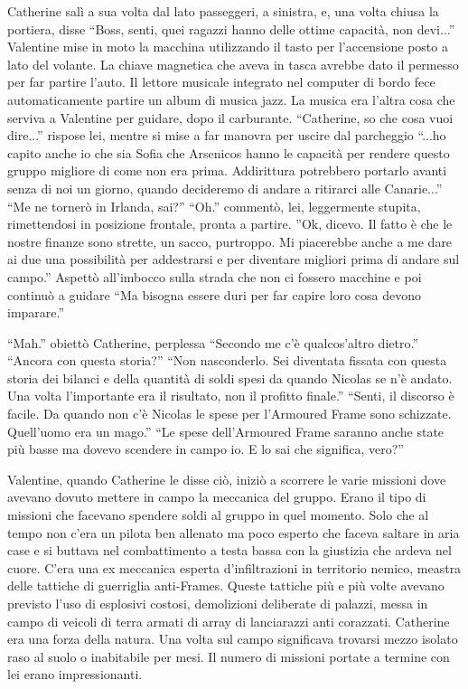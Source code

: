    Catherine salì a sua volta dal lato passeggeri, a sinistra, e, una volta chiusa la portiera, disse ``Boss, senti,
    quei ragazzi hanno delle ottime capacità, non devi...'' Valentine mise in moto la macchina utilizzando il tasto per
    l'accensione posto a lato del volante. La chiave magnetica che aveva in tasca avrebbe dato il permesso per far
    partire l'auto. Il lettore musicale integrato nel computer di bordo fece automaticamente partire un album di musica
    jazz. La musica era l'altra cosa che serviva a Valentine per guidare, dopo il carburante. ``Catherine, so che cosa
    vuoi dire...'' rispose lei, mentre si mise a far manovra per uscire dal
    parcheggio ``...ho capito anche io che sia Sofia che Arsenicos hanno le capacità per rendere questo gruppo migliore
    di come non era prima. Addirittura potrebbero portarlo avanti senza di noi un giorno, quando decideremo di andare a
    ritirarci alle Canarie...'' ``Me ne tornerò in Irlanda, sai?'' ``Oh.'' commentò, lei, leggermente stupita,
    rimettendosi in posizione frontale, pronta a partire. ''Ok, dicevo. Il fatto è che le nostre finanze sono strette,
    un sacco, purtroppo. Mi piacerebbe anche a me dare ai due una possibilità per addestrarsi e per diventare migliori
    prima di andare sul campo.'' Aspettò all'imbocco sulla strada che non ci fossero macchine e poi continuò a guidare
    ``Ma bisogna essere duri per far capire loro cosa devono imparare.''

    ``Mah.'' obiettò Catherine, perplessa ``Secondo me c'è qualcos'altro dietro.'' ``Ancora con questa storia?'' ``Non
    nasconderlo. Sei diventata fissata con questa storia dei bilanci e della quantità di soldi spesi da quando Nicolas
    se n'è andato. Una volta l'importante era il risultato, non il profitto finale.'' ``Senti, il discorso è facile. Da
    quando non c'è Nicolas le spese per l'Armoured Frame sono schizzate. Quell'uomo era un mago.'' ``Le spese
    dell'Armoured Frame saranno anche state più basse ma dovevo scendere in campo io. E lo sai che significa, vero?''

    Valentine, quando Catherine le disse ciò, iniziò a scorrere le varie missioni dove avevano dovuto mettere in campo
    la meccanica del gruppo. Erano il tipo di missioni che facevano spendere soldi al gruppo in quel momento. Solo che
    al tempo non c'era un pilota ben allenato ma poco esperto che faceva saltare in aria case e si buttava nel
    combattimento a testa bassa con la giustizia che ardeva nel cuore. C'era una ex meccanica esperta d'infiltrazioni
    in territorio nemico, meastra delle tattiche di guerriglia anti-Frames. Queste tattiche più e più volte avevano
    previsto l'uso di esplosivi costosi, demolizioni deliberate di palazzi, messa in campo di veicoli di terra armati di
    array di lanciarazzi anti corazzati. Catherine era una forza della natura. Una volta sul campo significava trovarsi
    mezzo isolato raso al suolo o inabitabile per mesi. Il numero di missioni portate a termine con lei erano
    impressionanti.
    
